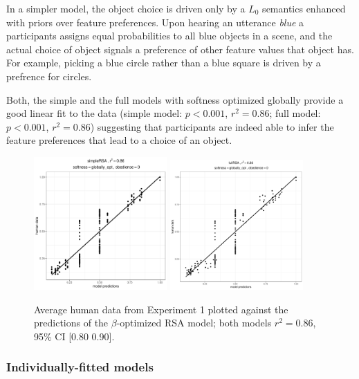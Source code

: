 \documentclass[10pt,a4paper]{article}
\newcommand{\gcs}[1]{\textcolor{blue}{[gcs: #1]}}
\begin{document}
In a simpler model, the object choice is driven only by a $L_0$ semantics enhanced with priors over feature preferences. Upon hearing an utterance \textit{blue} a participants assigns equal probabilities to all blue objects in a scene, and the actual choice of object signals a preference of other feature values that object has. For example, picking a blue circle rather than a blue square is driven by a prefrence for circles.

Both, the simple and the full models with softness optimized globally provide a good linear fit to the data (simple model: $p < 0.001$, $r^2 = 0.86$; full model: $p < 0.001$, $r^2 = 0.86$) suggesting that participants are indeed able to infer the feature preferences that lead to a choice of an object. %

\begin{figure}[ht]
	\centering
	\includegraphics[width=2in]{images/m13.pdf}
	\includegraphics[width=2in]{images/m23.pdf}
	\caption{Average human data from Experiment 1 plotted against the predictions of the $\beta$-optimized RSA model; both models $r^{2}=0.86$, 95\% CI [0.80 0.90].}\label{simple-full}
\end{figure}


\subsubsection{Individually-fitted models}
\end{document}
